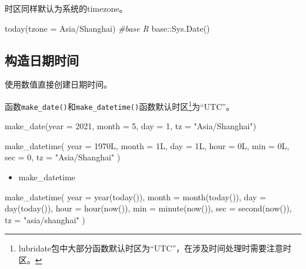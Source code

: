 \documentclass[
]{book}
\newenvironment{Shaded}{\begin{snugshade}}{\end{snugshade}}
\newcommand{\AttributeTok}[1]{\textcolor[rgb]{0.77,0.63,0.00}{#1}}
\newcommand{\CommentTok}[1]{\textcolor[rgb]{0.56,0.35,0.01}{\textit{#1}}}
\newcommand{\DecValTok}[1]{\textcolor[rgb]{0.00,0.00,0.81}{#1}}
\newcommand{\FunctionTok}[1]{\textcolor[rgb]{0.00,0.00,0.00}{#1}}
\newcommand{\NormalTok}[1]{#1}
\newcommand{\SpecialCharTok}[1]{\textcolor[rgb]{0.00,0.00,0.00}{#1}}
\newcommand{\StringTok}[1]{\textcolor[rgb]{0.31,0.60,0.02}{#1}}
\providecommand{\tightlist}{%
  \setlength{\itemsep}{0pt}\setlength{\parskip}{0pt}}
\begin{document}
时区同样默认为系统的timezone。

\begin{Shaded}
\begin{Highlighting}[]
\FunctionTok{today}\NormalTok{(}\AttributeTok{tzone =} \StringTok{\textquotesingle{}Asia/Shanghai\textquotesingle{}}\NormalTok{)}
\CommentTok{\#base R}
\NormalTok{base}\SpecialCharTok{::}\FunctionTok{Sys.Date}\NormalTok{()}
\end{Highlighting}
\end{Shaded}

\hypertarget{lubridate:make-datetime}{%
\subsection{构造日期时间}\label{lubridate:make-datetime}}

使用数值直接创建日期时间。

函数\texttt{make\_date()}和\texttt{make\_datetime()}函数默认时区\footnote{lubridate包中大部分函数默认时区为``UTC''，在涉及时间处理时需要注意时区。}为``UTC''。

\begin{Shaded}
\begin{Highlighting}[]
\FunctionTok{make\_date}\NormalTok{(}\AttributeTok{year =} \DecValTok{2021}\NormalTok{, }\AttributeTok{month =} \DecValTok{5}\NormalTok{, }\AttributeTok{day =} \DecValTok{1}\NormalTok{, }\AttributeTok{tz =} \StringTok{"Asia/Shanghai"}\NormalTok{)}

\FunctionTok{make\_datetime}\NormalTok{(}
  \AttributeTok{year =}\NormalTok{ 1970L,}
  \AttributeTok{month =}\NormalTok{ 1L,}
  \AttributeTok{day =}\NormalTok{ 1L,}
  \AttributeTok{hour =}\NormalTok{ 0L,}
  \AttributeTok{min =}\NormalTok{ 0L,}
  \AttributeTok{sec =} \DecValTok{0}\NormalTok{,}
  \AttributeTok{tz =} \StringTok{"Asia/Shanghai"}
\NormalTok{)}
\end{Highlighting}
\end{Shaded}

\begin{itemize}
\tightlist
\item
  make\_datetime
\end{itemize}

\begin{Shaded}
\begin{Highlighting}[]
\FunctionTok{make\_datetime}\NormalTok{(}
  \AttributeTok{year =} \FunctionTok{year}\NormalTok{(}\FunctionTok{today}\NormalTok{()),}
  \AttributeTok{month =} \FunctionTok{month}\NormalTok{(}\FunctionTok{today}\NormalTok{()),}
  \AttributeTok{day =} \FunctionTok{day}\NormalTok{(}\FunctionTok{today}\NormalTok{()),}
  \AttributeTok{hour =} \FunctionTok{hour}\NormalTok{(}\FunctionTok{now}\NormalTok{()),}
  \AttributeTok{min =} \FunctionTok{minute}\NormalTok{(}\FunctionTok{now}\NormalTok{()),}
  \AttributeTok{sec =} \FunctionTok{second}\NormalTok{(}\FunctionTok{now}\NormalTok{()),}
  \AttributeTok{tz =} \StringTok{"asia/shanghai"}
\NormalTok{)}
\end{Highlighting}
\end{Shaded}
\end{document}

